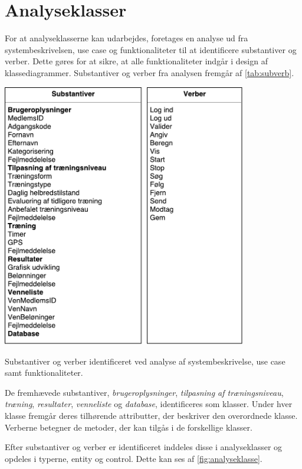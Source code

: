\section{Analyseklasser} \label{sec:analyseklasser}
For at analyseklasserne kan udarbejdes, foretages en analyse ud fra systembeskrivelsen, use case og funktionaliteter til at identificere substantiver og verber. Dette gøres for at sikre, at alle funktionaliteter indgår i design af klassediagrammer. Substantiver og verber fra analysen fremgår af \autoref{tab:subverb}.

\begin{table}[H]
\centering
\includegraphics[width=0.8\textwidth]{figures/aktivitetsdiagram/substantiveverber}
\caption{Substantiver og verber identificeret ved analyse af systembeskrivelse, use case samt funktionaliteter.}
\label{tab:subverb}
\end{table}

\noindent
De fremhævede substantiver, \textit{brugeroplysninger}, \textit{tilpasning af træningsniveau}, \textit{træning}, \textit{resultater}, \textit{venneliste} og \textit{database}, identificeres som klasser. Under hver klasse fremgår deres tilhørende attributter, der beskriver den overordnede klasse. Verberne betegner de metoder, der kan tilgås i de forskellige klasser. 

Efter substantiver og verber er identificeret inddeles disse i analyseklasser og opdeles i typerne, entity og control. Dette kan ses af \autoref{fig:analyseklasse}. 

